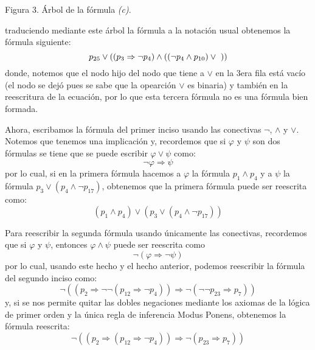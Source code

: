 \documentclass[12pt]{article}
\newcounter{it}
\theoremstyle{largebreak}
\begin{document}
\begin{sol}
\begin{enumerate}
\begin{center}
                Figura 3. Árbol de la fórmula \textit{(c)}.
            \end{center}
            traduciendo mediante este árbol la fórmula a la notación usual obtenemos la fórmula siguiente:
            \begin{equation*}
                p_{25}\lor((p_3\Rightarrow\neg p_4)\land((\neg p_4\land p_{10})\lor\textup{  }))
            \end{equation*}
            donde, notemos que el nodo hijo del nodo que tiene a $\lor$ en la 3era fila está vacío (el nodo se dejó pues se sabe que la opearción $\lor$ es binaria) y también en la reescritura de la ecuación, por lo que esta tercera fórmula no es una fórmula bien formada. 
        \end{enumerate}
        Ahora, escribamos la fórmula del primer inciso usando las conectivas $\neg$, $\land$ y $\lor$. Notemos que tenemos una implicación y, recordemos que si $\varphi$ y $\psi$ son dos fórmulas se tiene que se puede escribir $\varphi\lor\psi$ como:
        \begin{equation*}
            \neg\varphi\Rightarrow\psi
        \end{equation*}
        por lo cual, si en la primera fórmula hacemos a $\varphi$ la fórmula $p_1\land p_4$ y a $\psi$ la fórmula $p_3\lor(p_4\land\neg p_{17})$, obtenemos que la primera fórmula puede ser reescrita como:
        \begin{equation*}
            (p_1\land p_4)\lor(p_3\lor(p_4\land\neg p_{17}))
        \end{equation*}

        Para reescribir la segunda fórmula usando únicamente las conectivas, recordemos que si $\varphi$ y $\psi$, entonces $\varphi\land\psi$ puede ser reescrita como
        \begin{equation*}
            \neg(\varphi\Rightarrow\neg\psi)
        \end{equation*}
        por lo cual, usando este hecho y el hecho anterior, podemos reescribir la fórmula del segundo inciso como:
        \begin{equation*}
            \neg\left((p_2\Rightarrow\neg\neg(p_{12}\Rightarrow \neg p_4)) \Rightarrow\neg(\neg\neg p_{23}\Rightarrow p_7) \right)
        \end{equation*}
        y, si se nos permite quitar las dobles negaciones mediante los axiomas de la lógica de primer orden y la única regla de inferencia Modus Ponens, obtenemos la fórmula reescrita:
        \begin{equation*}
            \neg\left((p_2\Rightarrow(p_{12}\Rightarrow\neg p_4)) \Rightarrow\neg(p_{23}\Rightarrow p_7) \right)
        \end{equation*}
    \end{sol}
\end{document}
